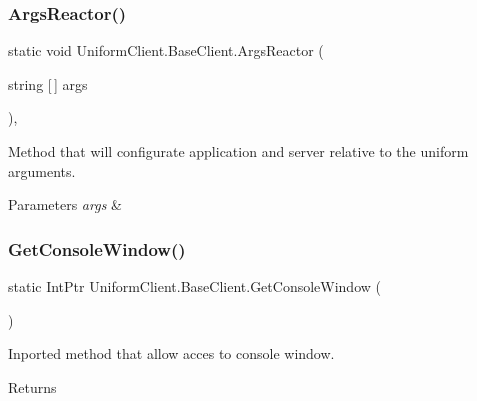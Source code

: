 \subsubsection{\texorpdfstring{Args\+Reactor()}{ArgsReactor()}}
{\footnotesize\ttfamily static void Uniform\+Client.\+Base\+Client.\+Args\+Reactor (\begin{DoxyParamCaption}\item[{string \mbox{[}$\,$\mbox{]}}]{args }\end{DoxyParamCaption})\hspace{0.3cm}{\ttfamily [static]}, {\ttfamily [protected]}}



Method that will configurate application and server relative to the uniform arguments. 


\begin{DoxyParams}{Parameters}
{\em args} & \\
\hline
\end{DoxyParams}
\mbox{\label{class_uniform_client_1_1_base_client_aafcfed25b79baed0db4448f2e30f2aa2}} 
\subsubsection{\texorpdfstring{Get\+Console\+Window()}{GetConsoleWindow()}}
{\footnotesize\ttfamily static Int\+Ptr Uniform\+Client.\+Base\+Client.\+Get\+Console\+Window (\begin{DoxyParamCaption}{ }\end{DoxyParamCaption})\hspace{0.3cm}{\ttfamily [protected]}}



Inported method that allow acces to console window. 

\begin{DoxyReturn}{Returns}

\end{DoxyReturn}
\mbox{\label{class_uniform_client_1_1_base_client_a8abbd1d46cc50556eeae8bbd55ce680f}} 
